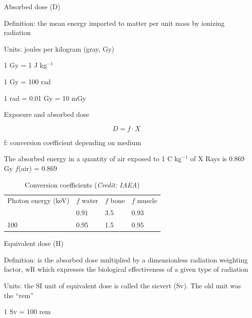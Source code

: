 \begin{frame}{Absorbed dose (D)}

\alert{Definition}: the mean energy imparted to matter per unit mass by ionizing radiation

\alert{Units}:  joules per kilogram  (gray, Gy)

\begin{block}{}

1 Gy = 1 J kg$^{-1}$

1 Gy = 100 rad

1 rad = 0.01 Gy = 10 mGy

\end{block}


\end{frame}


\begin{frame}{Exposure and absorbed dose}

\begin{block}{}
\[D = f \cdot X\]
\end{block}

\begin{block}{}
f: conversion coefficient depending on medium
\end{block}

\alert{The absorbed energy in a quantity of air exposed to 1 C kg$^{-1}$ of X Rays is 0.869 Gy
$f$(air) = 0.869}

\begin{table}[H]
\caption*{Conversion coefficients (\emph{Credit: IAEA})}
\vskip 0.2cm
\begin{center}
  \begin{tabular}{llll}
  \toprule
  Photon energy (keV) & $f$ water & $f$ bone  & $f$ muscle \\ \otoprule
10 & 0.91 & 3.5 & 0.93 \\
100 & 0.95 & 1.5 & 0.95  \\ \bottomrule
\end{tabular}
\end{center}
\end{table}

\end{frame}

\begin{frame}{Equivalent dose (H)}

\alert{Definition}: is the absorbed dose multiplied by a dimensionless radiation weighting factor, wR which expresses the biological effectiveness of a given type of radiation

\alert{Units}: the SI unit of equivalent dose is called the sievert (Sv). The old unit was the ``rem''

\begin{block}{}
1 Sv = 100 rem
\end{block}

\end{frame}


